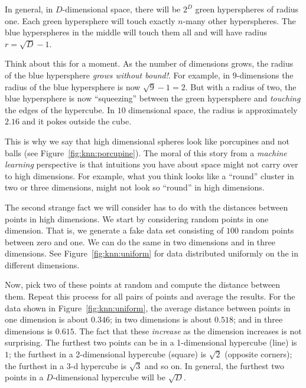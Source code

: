 In general, in $D$-dimensional space, there will be $2^D$ green
hyperspheres of radius one.  Each green hypersphere will touch exactly
$n$-many other hyperspheres.  The blue hyperspheres in the middle will
touch them all and will have radius $r = \sqrt D - 1$.

Think about this for a moment.  As the number of dimensions grows, the
radius of the blue hypersphere \emph{grows without bound!}.  For
example, in $9$-dimensions the radius of the blue hypersphere is now
$\sqrt9-1 = 2$.  But with a radius of two, the blue hypersphere is now
``squeezing'' between the green hypersphere and \emph{touching} the
edges of the hypercube.  In $10$ dimensional space, the radius is
approximately $2.16$ and it pokes outside the cube.


This is why we say that high dimensional spheres look like porcupines
and not balls (see Figure~\ref{fig:knn:porcupine}).  The moral of this
story from a \emph{machine learning} perspective is that intuitions
you have about space might not carry over to high dimensions.  For
example, what you think looks like a ``round'' cluster in two or three
dimensions, might not look so ``round'' in high dimensions.


The second strange fact we will consider has to do with the distances
between points in high dimensions.  We start by considering random
points in one dimension.  That is, we generate a fake data set
consisting of $100$ random points between zero and one.  We can do the
same in two dimensions and in three dimensions.  See
Figure~\ref{fig:knn:uniform} for data distributed uniformly on the
 in different dimensions.

Now, pick two of these points at random and compute the distance
between them.  Repeat this process for all pairs of points and average
the results.  For the data shown in Figure~\ref{fig:knn:uniform}, the
average distance between points in one dimension is about $0.346$; in two
dimensions is about $0.518$; and in three dimensions is $0.615$. The fact that these \emph{increase} as the dimension increases is not surprising. The furthest two points can be in a 1-dimensional hypercube (line) is $1$; the furthest in a 2-dimensional hypercube (square) is $\sqrt 2$ (opposite corners); the furthest in a 3-d hypercube is $\sqrt 3$ and so on. In general, the furthest two points in a $D$-dimensional hypercube will be $\sqrt D$.

